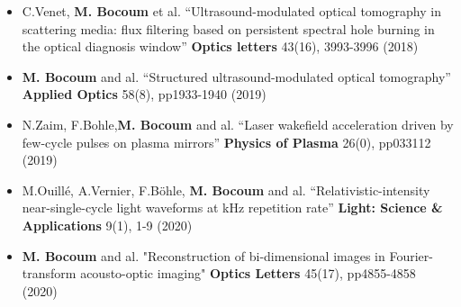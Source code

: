 \documentclass[11pt,a4paper,sans]{moderncv} %
\begin{document}
\begin{itemize}
\item  C.Venet, \textbf{M. Bocoum} et al. “Ultrasound-modulated optical tomography in scattering media: flux filtering based on persistent spectral hole burning in the optical diagnosis window” \textbf{Optics letters} 43(16), 3993-3996 (2018)

\item  \textbf{M. Bocoum} and al. “Structured ultrasound-modulated optical tomography” \textbf{Applied Optics} 58(8), pp1933-1940 (2019)

\item  N.Zaim, F.Bohle,\textbf{M. Bocoum} and al. “Laser wakefield acceleration driven by few-cycle pulses on plasma mirrors” \textbf{Physics of Plasma} 26(0), pp033112 (2019)

\item  M.Ouillé, A.Vernier, F.Böhle, \textbf{M. Bocoum} and al. “Relativistic-intensity near-single-cycle light waveforms at kHz repetition rate” \textbf{Light: Science \& Applications} 9(1), 1-9 (2020)

\item \textbf{M. Bocoum} and al. "Reconstruction of bi-dimensional images in Fourier-transform acousto-optic imaging" \textbf{Optics Letters} 45(17), pp4855-4858 (2020)


\end{itemize}

\end{document}
